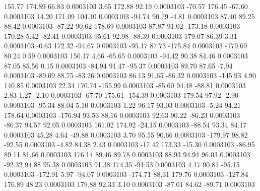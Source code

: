       155.77      174.89       66.83     0.0003103
        3.65      172.88       92.19     0.0003103
      -70.57      176.45      -67.60     0.0003103
       14.20      171.09      104.10     0.0003103
      -94.74       90.79       -4.81     0.0003103
       87.40       89.25       88.42     0.0003103
      -87.22       90.62      178.69     0.0003103
       87.87       91.02     -173.18     0.0003103
      170.28        5.42      -82.41     0.0003103
       95.61       92.98      -88.39     0.0003103
      179.07       86.39        3.31     0.0003103
       -0.63      172.32      -94.67     0.0003103
      -95.17       87.73     -175.84     0.0003103
     -179.69       80.24        0.59     0.0003103
      150.17        4.66      -65.65     0.0003103
      -94.42       90.38       84.46     0.0003103
       87.05       85.56        0.15     0.0003103
      -84.94       91.47      -95.37     0.0003103
       89.70       87.65       -7.94     0.0003103
      -89.09       88.75      -83.26     0.0003103
       86.13       91.65      -86.32     0.0003103
     -145.93        4.90      140.85     0.0003103
       22.34      170.74     -155.99     0.0003103
      -85.60       94.48      -88.81     0.0003103
        2.83        1.27       -2.10     0.0003103
      -67.70      175.61     -154.39     0.0003103
      179.54       97.92       -2.90     0.0003103
      -95.34       88.04        5.10     0.0003103
        1.22       96.17       93.03     0.0003103
       -5.24       94.21      178.64     0.0003103
     -176.94       93.53       88.16     0.0003103
       92.63       90.22      -86.23     0.0003103
      -86.37       94.57       92.05     0.0003103
      161.02      174.92      -24.15     0.0003103
      -88.54       93.34       84.17     0.0003103
       45.28        4.64      -49.88     0.0003103
        3.70       95.55       90.66     0.0003103
     -179.97       98.82      -92.55     0.0003103
       -4.82       84.38        2.43     0.0003103
      -17.42      173.33      -15.30     0.0003103
      -86.95       89.11       81.66     0.0003103
      176.14       89.46       89.78     0.0003103
       88.93       94.94       96.03     0.0003103
      -92.32       94.88       95.38     0.0003103
       91.38      174.35      -91.53     0.0003103
        4.17       90.81      -95.15     0.0003103
     -172.91        5.97      -94.07     0.0003103
     -174.71       88.31      179.76     0.0003103
     -127.84      176.89       48.23     0.0003103
      179.88       92.33        3.10     0.0003103
      -87.01       84.62      -89.71     0.0003103
